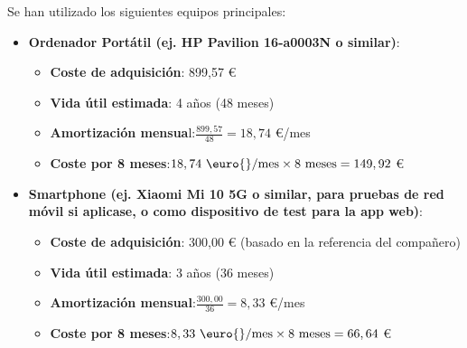 Se han utilizado los siguientes equipos principales:

\begin{itemize}

    \item\textbf{Ordenador Portátil (ej. HP Pavilion 16-a0003N o similar)}:
        \begin{itemize}

            \item\textbf{Coste de adquisición}: 899,57 \euro{} 
            
            \item\textbf{Vida útil estimada}: 4 años (48 meses)
            
            \item\textbf{Amortización mensua}l:$\displaystyle \frac{899,57}{48} = 18,74 $ \euro{}/mes
            
            \item\textbf{Coste por 8 meses}:$\displaystyle 18,74 \text{ \euro{}/mes} \times 8 \text{ meses} = 149,92 $ \euro{}
                   
        \end{itemize}
    
    \item\textbf{Smartphone (ej. Xiaomi Mi 10 5G o similar, para pruebas de red móvil si aplicase, o como dispositivo de test para la app web)}:
    
        \begin{itemize}
        
            \item\textbf{Coste de adquisición}: 300,00 \euro{} (basado en la referencia del compañero)
            
            \item\textbf{Vida útil estimada}: 3 años (36 meses)
            
            \item\textbf{Amortización mensual}:$\displaystyle \frac{300,00}{36} = 8,33 $ \euro{}/mes
            
            \item\textbf{Coste por 8 meses}:$\displaystyle 8,33 \text{ \euro{}/mes} \times 8 \text{ meses} = 66,64 $ \euro{}
                
        \end{itemize}
    

\end{itemize}
